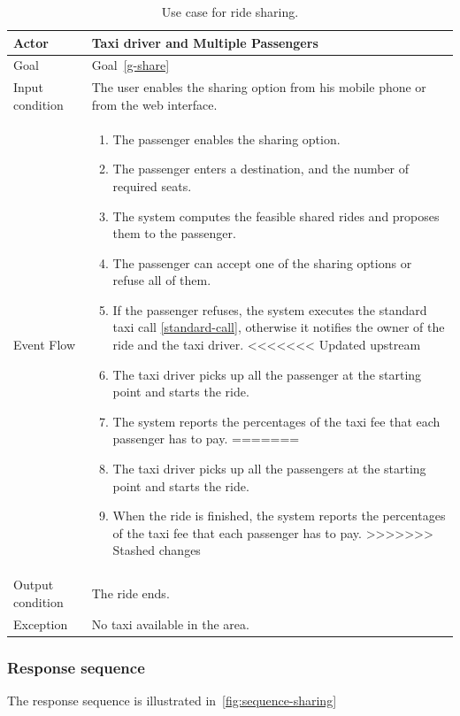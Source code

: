\begin{table}
\begin{center}
\begin{tabular}{| l | p{} |}
\hline
Actor & Taxi driver and Multiple Passengers \\
\hline
Goal & Goal~\ref{g-share}
\\
\hline
Input condition & The user enables the sharing option from his mobile phone or from the web interface.  \\
\hline
Event Flow &
\begin{enumerate}
	\item The passenger enables the sharing option.
	\item The passenger enters a destination, and the number of required seats.
	\item The system computes the feasible shared rides and proposes them to the passenger.
	\item The passenger can accept one of the sharing options or refuse all of them.
	\item If the passenger refuses, the system executes the standard taxi call \ref{standard-call}, otherwise it notifies the owner of the ride and the taxi driver.
<<<<<<< Updated upstream
	\item The taxi driver picks up all the passenger at the starting point and starts the ride.
	\item The system reports the percentages of the taxi fee that each passenger has to pay.
=======
	\item The taxi driver picks up all the passengers at the starting point and starts the ride.
	\item When the ride is finished, the system reports the percentages of the taxi fee that each passenger has to pay.
>>>>>>> Stashed changes
\end{enumerate}
\\
\hline
Output condition & The ride ends. \\
\hline
Exception & No taxi available in the area. \\
\hline
\end{tabular}
\end{center}
\caption{Use case for ride sharing.}
\label{usecase-ridesharing}
\end{table}

\subsubsection{Response sequence}
The response sequence is illustrated in~\autoref{fig:sequence-sharing}

